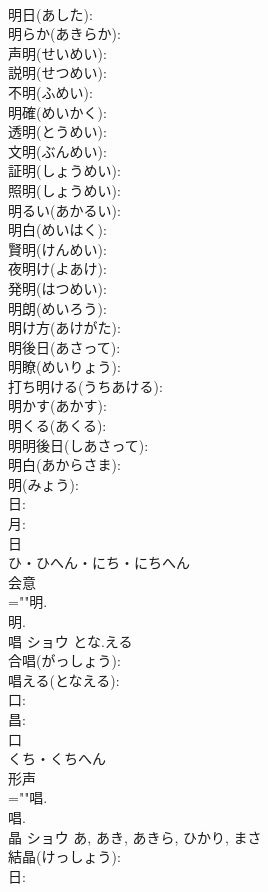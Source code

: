 \documentclass[8pt]{extreport}
\begin{document}
\begin{CJK}{UTF8}{min}
\\	明日(あした): 
\\	明らか(あきらか): 
\\	声明(せいめい): 
\\	説明(せつめい): 
\\	不明(ふめい): 
\\	明確(めいかく): 
\\	透明(とうめい): 
\\	文明(ぶんめい): 
\\	証明(しょうめい): 
\\	照明(しょうめい): 
\\	明るい(あかるい): 
\\	明白(めいはく): 
\\	賢明(けんめい): 
\\	夜明け(よあけ): 
\\	発明(はつめい): 
\\	明朗(めいろう): 
\\	明け方(あけがた): 
\\	明後日(あさって): 
\\	明瞭(めいりょう): 
\\	打ち明ける(うちあける): 
\\	明かす(あかす): 
\\	明くる(あくる): 
\\	明明後日(しあさって): 
\\	明白(あからさま): 
\\	明(みょう): 
\\	日: 
\\	月: 
\\	日	
\\	ひ・ひへん・にち・にちへん	
\\	会意 
\\	=""明.
\\	明.
\\	唱	ショウ	とな.える		
\\	合唱(がっしょう): 
\\	唱える(となえる): 
\\	口: 
\\	昌: 
\\	口	
\\	くち・くちへん	
\\	形声 
\\	=""唱.
\\	唱.
\\	晶	ショウ		あ, あき, あきら, ひかり, まさ	
\\	結晶(けっしょう): 
\\	日: 

\end{CJK}
\end{document}
